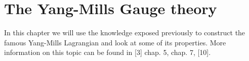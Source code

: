 \documentclass[12pt,a4paper]{report}
\theoremstyle{definition}
\newtheorem{Def}{Definition}[chapter]
\theoremstyle{Theorem}
\newtheorem{Prop}[Def]{Proposition}
\theoremstyle{definition}
\theoremstyle{definition}
\begin{document}
	\begin{comment}
		\chapter{The Euler-Lagrange equations}
		In this chapter we will look at how to define the Euler-Lagrange equations on the framework of differential geometry. We will apply the results of this chapter in the study of the general solutions of the Yang-Mills Lagrangian. REFERENZA
		\section{Lagrangians and gauge invariance}
		In this section we will give the definition of a gauge invariant Lagrangian and look at some properties of it. REFERENZA
		\begin{Def}
			Let $(P,M,\pi,G)$ be a principal $G$-bundle and $\rho:G\rightarrow GL(V)$ a representation. We define the space of \textit{1-Jets} as:
			$$J(P,V)=\{(p,v,T)|p\in P,v\in V, T:T_pP\rightarrow V \hbox{linear}\}$$
		\end{Def}
		\begin{Prop}
			The 1-Jets space is a smooth manifold.
		\end{Prop}
		\begin{proof}
			
		\end{proof}
	\end{comment}
	\chapter{The Yang-Mills Gauge theory}
	In this chapter we will use the knowledge exposed previously to construct the famous Yang-Mills Lagrangian and look at some of its properties. More information on this topic can be found in [3] chap. 5, chap. 7, [10].
\end{document}
